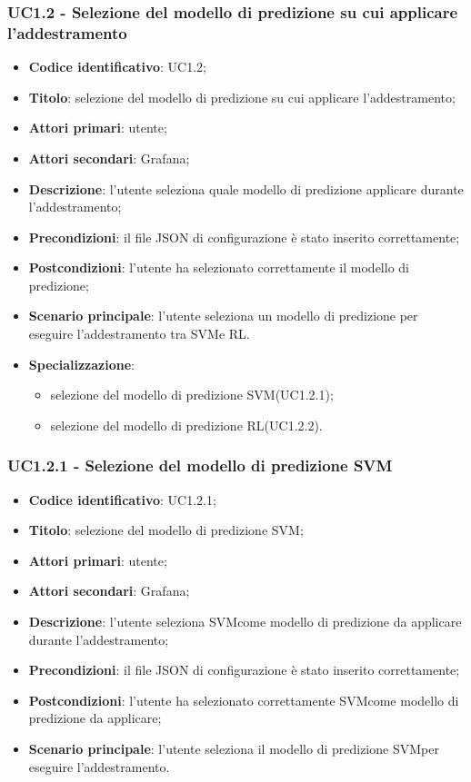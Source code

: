 \subsubsection{UC1.2 - Selezione del modello di predizione su cui applicare l'addestramento}
\begin{itemize}
	\item \textbf{Codice identificativo}: UC1.2;
	\item \textbf{Titolo}: selezione del modello di predizione su cui applicare l'addestramento;
	\item \textbf{Attori primari}: utente;
	\item \textbf{Attori secondari}: Grafana\glo;
	\item \textbf{Descrizione}: l'utente seleziona quale modello di predizione applicare durante l'addestramento;
	\item \textbf{Precondizioni}: il file JSON di configurazione è stato inserito correttamente;
	\item \textbf{Postcondizioni}: l'utente ha selezionato correttamente il modello di predizione;
	\item \textbf{Scenario principale}: l'utente seleziona un modello di predizione per eseguire l'addestramento tra SVM\glosp e RL\glo.
	\item \textbf{Specializzazione}:
	\begin{itemize}
		\item selezione del modello di predizione SVM\glosp (UC1.2.1);
		\item selezione del modello di predizione RL\glosp (UC1.2.2).
	\end{itemize}
\end{itemize}
\subsubsection{UC1.2.1 - Selezione del modello di predizione SVM}
\begin{itemize}
	\item \textbf{Codice identificativo}: UC1.2.1;
	\item \textbf{Titolo}: selezione del modello di predizione SVM\glo;
	\item \textbf{Attori primari}: utente;
	\item \textbf{Attori secondari}: Grafana\glo;
	\item \textbf{Descrizione}: l'utente seleziona SVM\glosp come modello di predizione da applicare durante l'addestramento;
	\item \textbf{Precondizioni}: il file JSON di configurazione è stato inserito correttamente;
	\item \textbf{Postcondizioni}: l'utente ha selezionato correttamente SVM\glosp come modello di predizione da applicare;
	\item \textbf{Scenario principale}: l'utente seleziona il modello di predizione SVM\glosp per eseguire l'addestramento.
\end{itemize}
